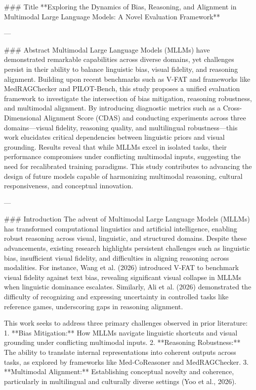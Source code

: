 ### Title  
**Exploring the Dynamics of Bias, Reasoning, and Alignment in Multimodal Large Language Models: A Novel Evaluation Framework**

---

### Abstract  
Multimodal Large Language Models (MLLMs) have demonstrated remarkable capabilities across diverse domains, yet challenges persist in their ability to balance linguistic bias, visual fidelity, and reasoning alignment. Building upon recent benchmarks such as V-FAT and frameworks like MedRAGChecker and PILOT-Bench, this study proposes a unified evaluation framework to investigate the intersection of bias mitigation, reasoning robustness, and multimodal alignment. By introducing diagnostic metrics such as a Cross-Dimensional Alignment Score (CDAS) and conducting experiments across three domains—visual fidelity, reasoning quality, and multilingual robustness—this work elucidates critical dependencies between linguistic priors and visual grounding. Results reveal that while MLLMs excel in isolated tasks, their performance compromises under conflicting multimodal inputs, suggesting the need for recalibrated training paradigms. This study contributes to advancing the design of future models capable of harmonizing multimodal reasoning, cultural responsiveness, and conceptual innovation.

---

### Introduction  
The advent of Multimodal Large Language Models (MLLMs) has transformed computational linguistics and artificial intelligence, enabling robust reasoning across visual, linguistic, and structured domains. Despite these advancements, existing research highlights persistent challenges such as linguistic bias, insufficient visual fidelity, and difficulties in aligning reasoning across modalities. For instance, Wang et al. (2026) introduced V-FAT to benchmark visual fidelity against text bias, revealing significant visual collapse in MLLMs when linguistic dominance escalates. Similarly, Ali et al. (2026) demonstrated the difficulty of recognizing and expressing uncertainty in controlled tasks like reference games, underscoring gaps in reasoning alignment.

This work seeks to address three primary challenges observed in prior literature:  
1. **Bias Mitigation:** How MLLMs navigate linguistic shortcuts and visual grounding under conflicting multimodal inputs.  
2. **Reasoning Robustness:** The ability to translate internal representations into coherent outputs across tasks, as explored by frameworks like Med-CoReasoner and MedRAGChecker.  
3. **Multimodal Alignment:** Establishing conceptual novelty and coherence, particularly in multilingual and culturally diverse settings (Yoo et al., 2026).  

